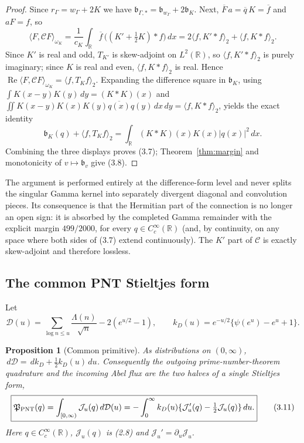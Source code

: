 \documentclass[11pt]{amsart}
\newtheorem{proposition}[theorem]{Proposition}
\theoremstyle{definition}
\theoremstyle{remark}
\newcommand{\R}{\mathbb R}
\newcommand{\dd}{\,d}
\begin{document}
\begin{proof}
Since \(r_\Gamma=w_\Gamma+2K\) we have
\(\mathfrak b_{\Gamma,*}=\mathfrak b_{w_\Gamma}+2\mathfrak b_K\).  Next,
\(\overline F\,a=\overline q\,K=\overline f\) and \(aF=f\), so
\[
 \langle F,\mathcal CF\rangle_{\omega_K}
 =\frac1{c_K}\int_\R\overline{f}\,\bigl((K'+\tfrac12K)*f\bigr)\dd x
 =2\langle f,K'*f\rangle_2+\langle f,K*f\rangle_2 .
\]
Since \(K'\) is real and odd, \(T_{K'}\) is skew-adjoint on \(L^2(\R)\),
so \(\langle f,K'*f\rangle_2\) is purely imaginary; since \(K\) is real and
even, \(\langle f,K*f\rangle_2\) is real.  Hence
\(\operatorname{Re}\langle F,\mathcal CF\rangle_{\omega_K}=\langle f,T_Kf\rangle_2\).
Expanding the difference square in \(\mathfrak b_K\), using
\(\int K(x-y)K(y)\dd y=(K*K)(x)\) and
\(\iint K(x-y)K(x)K(y)\overline{q(x)}q(y)\dd x\dd y=\langle f,K*f\rangle_2\),
yields the exact identity
\[
 \mathfrak b_K(q)+\langle f,T_Kf\rangle_2
 =\int_\R(K*K)(x)K(x)|q(x)|^2\dd x .
\tag{3.9}
\]
Combining the three displays proves (3.7); Theorem~\ref{thm:margin} and
monotonicity of \(v\mapsto\mathfrak b_v\) give (3.8).
\end{proof}

The argument is performed entirely at the difference-form level and never
splits the singular Gamma kernel into separately divergent diagonal and
convolution pieces.  Its consequence is that the Hermitian part of the
connection is no longer an open sign: it is absorbed by the completed
Gamma remainder with the explicit margin \(499/2000\), for every
\(q\in C_c^\infty(\R)\) (and, by continuity, on any space where both sides
of (3.7) extend continuously).  The \(K'\) part of \(\mathcal C\) is
exactly skew-adjoint and therefore lossless.

\subsection{The common PNT Stieltjes form}

Let
\[
 \mathcal D(u)=\sum_{\log n\le u}\frac{\Lambda(n)}{\sqrt n}-2(e^{u/2}-1),
 \qquad
 k_D(u)=e^{-u/2}\{\psi(e^u)-e^u+1\} .
\tag{3.10}
\]

\begin{proposition}[Common primitive]
\label{prop:pnt}
As distributions on \((0,\infty)\),
\(\dd\mathcal D=\dd k_D+\frac12k_D(u)\dd u\).  Consequently the outgoing
prime-number-theorem quadrature and the incoming Abel flux are the two
halves of a single Stieltjes form,
\[
 \boxed{
 \mathfrak P_{\rm PNT}(q)
 =\int_{[0,\infty)}\mathcal J_u(q)\dd\mathcal D(u)
 =-\int_0^\infty k_D(u)\{\mathcal J_u'(q)-\tfrac12\mathcal J_u(q)\}\dd u .}
\tag{3.11}
\]
Here \(q\in C_c^\infty(\R)\), \(\mathcal J_u(q)\) is (2.8) and
\(\mathcal J_u'=\partial_u\mathcal J_u\).
\end{proposition}
\end{document}
